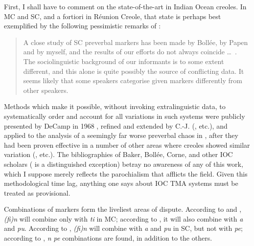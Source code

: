 First, I shall have to comment on the state-of-the-art in Indian Ocean creoles. In MC and SC, and a fortiori in Réunion Creole, that state is perhaps best exemplified by the following pessimistic remarks of \citet[94--95]{Corne1977}:

\begin{quote}
A close study of SC preverbal markers has been made by Bollée, by Papen and by myself, and the results of our efforts do not always coincide \ldots~. The sociolinguistic background of our informants is to some extent different, and this alone is quite possibly the source of conflicting data. It seems likely that some speakers categorise given markers differently from other speakers.
\end{quote}

Methods which make it possible, without invoking extralinguistic data, to systematically order and account for all variations in such systems were publicly presented by DeCamp in 1968 \citep{DeCamp1971}, refined and extended by C.-J. \citeauthor{Bailey1973} (\citeyear{Bailey1973}, etc.), and applied to the analysis of a seemingly far worse preverbal chaos in \citet{Bickerton1975}, after they had been proven effective in a number of other areas where creoles showed similar variation (\citealt{Bickerton1971,Bickerton1973a,Bickerton1973b}, etc.). The bibliographies of Baker, Bollée, Corne, and other IOC scholars (\citealt{CarayolEtAl1977} is a distinguished exception) betray no awareness of any of this work, which I suppose merely reflects the parochialism that afflicts the field. Given this methodological time lag, anything one says about IOC TMA systems must be treated as provisional.

Combinations of markers form the liveliest areas of dispute. According to \citet{Baker1972} and \citet{Valdman1980}, \textit{(fi)n} will combine only with \textit{ti} in MC; according to \citet{Moorghen1975}, it will also combine with \textit{a} and \textit{pu}. According to \citet{Bollee1977}, \textit{(fi)n} will combine with \textit{a} and \textit{pu} in SC, but not with \textit{pe}; according to \citet{Corne1977}, \textit{n pe} com\-binations are found, in addition to the others.

